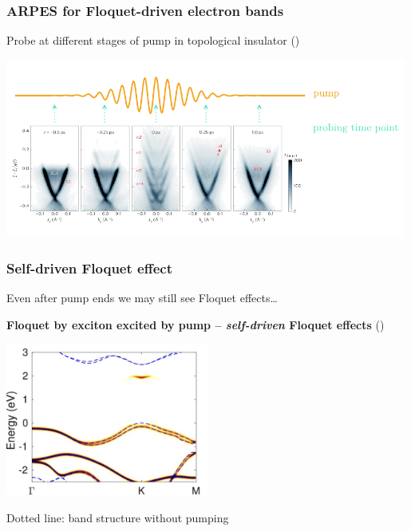 \documentclass[t]{beamer}
\begin{document}
\begin{frame}
\frametitle{ARPES for Floquet-driven electron bands}

Probe at different stages of pump in topological insulator (\cite{mahmood2016selective})

\begin{center}
    \includegraphics[width=0.99\textwidth]{plot/floquet-pump-relation.pdf}    
\end{center}


\end{frame}

\begin{frame}
\frametitle{Self-driven Floquet effect}

Even after pump ends we may still see Floquet effects\dots

\textbf{Floquet by exciton excited by pump -- \emph{self-driven} Floquet effects} (\cite{chan2023})

\begin{center}
    \includegraphics[width=0.5\textwidth]{plot/self-driven-floquet.jpg}
\end{center}

Dotted line: band structure without pumping

\end{frame}
\end{document}
